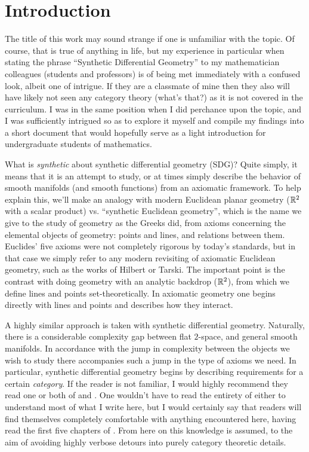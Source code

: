 \chapter*{Introduction}

The title of this work may sound strange if one is unfamiliar with the topic. Of course, that is true of anything in life, but my experience in particular when stating the phrase ``Synthetic Differential Geometry'' to my mathematician colleagues (students and professors) is of being met immediately with a confused look, albeit one of intrigue. If they are a classmate of mine then they also will have likely not seen any category theory (what's that?) as it is not covered in the curriculum. I was in the same position when I did perchance upon the topic, and I was sufficiently intrigued so as to explore it myself and compile my findings into a short document that would hopefully serve as a light introduction for undergraduate students of mathematics.

What is \emph{synthetic} about synthetic differential geometry (SDG)? Quite simply, it means that it is an attempt to study, or at times simply describe the behavior of smooth manifolds (and smooth functions) from an axiomatic framework. To help explain this, we'll make an analogy with modern Euclidean planar geometry (\( \mathbb{R}^2 \) with a scalar product) vs. ``synthetic Euclidean geometry'', which is the name we give to the study of geometry as the Greeks did, from axioms concerning the elemental objects of geometry: points and lines, and relations between them. Euclides' five axioms were not completely rigorous by today's standards, but in that case we simply refer to any modern revisiting of axiomatic Euclidean geometry, such as the works of Hilbert or Tarski. The important point is the contrast with doing geometry with an analytic backdrop (\( \mathbb{R}^2 \)), from which we define lines and points set-theoretically. In axiomatic geometry one begins directly with lines and points and describes how they interact.

A highly similar approach is taken with synthetic differential geometry. Naturally, there is a considerable complexity gap between flat \( 2 \)-space, and general smooth manifolds. In accordance with the jump in complexity between the objects we wish to study there accompanies such a jump in the type of axioms we need. In particular, synthetic differential geometry begins by describing requirements for a certain \emph{category}. If the reader is not familiar, I would highly recommend they read one or both of \cite{sml71} and \cite{lei16}. One wouldn't have to read the entirety of either to understand most of what I write here, but I would certainly say that readers will find themselves completely comfortable with anything encountered here, having read the first five chapters of \cite{lei16}. From here on this knowledge is assumed, to the aim of avoiding highly verbose detours into purely category theoretic details.

